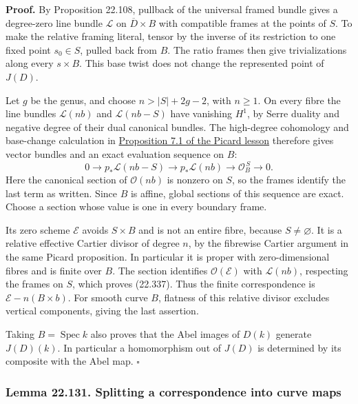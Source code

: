 \documentclass[
  11pt,
  a4paper,
]{article}
\begin{document}
\textbf{Proof.} By Proposition 22.108, pullback of the universal framed
bundle gives a degree-zero line bundle \(\mathcal L\) on
\(\overline D\times B\) with compatible frames at the points of \(S\).
To make the relative framing literal, tensor by the inverse of its
restriction to one fixed point \(s_0\in S\), pulled back from \(B\). The
ratio frames then give trivializations along every \(s\times B\). This
base twist does not change the represented point of \(J(D)\).

Let \(g\) be the genus, and choose \(n>|S|+2g-2\), with \(n\ge1\). On
every fibre the line bundles \(\mathcal L(nb)\) and \(\mathcal L(nb-S)\)
have vanishing \(H^1\), by Serre duality and negative degree of their
dual canonical bundles. The high-degree cohomology and base-change
calculation in
\href{https://kokunoyumeto.github.io/open-math-courses-public/courses/AG-HP/the-picard-functor-and-the-picard-scheme-of-a-curve.html\#7-degree-pieces-abel-fibres-and-properness}{Proposition
7.1 of the Picard lesson} therefore gives vector bundles and an exact
evaluation sequence on \(B\): \[
 0\longrightarrow p_*\mathcal L(nb-S)
  \longrightarrow p_*\mathcal L(nb)
  \longrightarrow\mathcal O_B^{\,S}\longrightarrow0.
 \tag{22.338}
\] Here the canonical section of \(\mathcal O(nb)\) is nonzero on \(S\),
so the frames identify the last term as written. Since \(B\) is affine,
global sections of this sequence are exact. Choose a section whose value
is one in every boundary frame.

Its zero scheme \(\mathcal E\) avoids \(S\times B\) and is not an entire
fibre, because \(S\ne\varnothing\). It is a relative effective Cartier
divisor of degree \(n\), by the fibrewise Cartier argument in the same
Picard proposition. In particular it is proper with zero-dimensional
fibres and is finite over \(B\). The section identifies
\(\mathcal O(\mathcal E)\) with \(\mathcal L(nb)\), respecting the
frames on \(S\), which proves (22.337). Thus the finite correspondence
is \(\mathcal E-n(B\times b)\). For smooth curve \(B\), flatness of this
relative divisor excludes vertical components, giving the last
assertion.

Taking \(B=\operatorname{Spec}k\) also proves that the Abel images of
\(D(k)\) generate \(J(D)(k)\). In particular a homomorphism out of
\(J(D)\) is determined by its composite with the Abel map. \(\square\)

\subsubsection{Lemma 22.131. Splitting a correspondence into curve
maps}\label{lemma-22.131.-splitting-a-correspondence-into-curve-maps}
\end{document}
